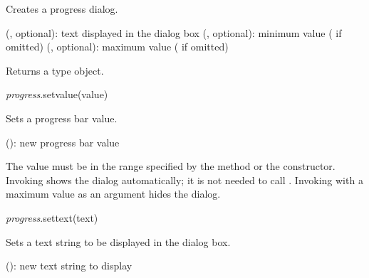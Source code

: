 \documentclass[a4paper,12pt,twoside,extrafontsizes]{memoir}
\begin{document}
\begin{funcdescr}
	Creates a progress dialog.
\end{funcdescr}

\begin{funcparams}
	 (, optional): text displayed in the dialog box
	 (, optional): minimum value ( if omitted)
	 (, optional): maximum value ( if omitted)
\end{funcparams}

\begin{funcret}
	Returns a  type object.
\end{funcret}


\begin{luafuncprototype}
\emph{progress}.setvalue(value)
\end{luafuncprototype}

\begin{funcdescr}
	Sets a progress bar value.
\end{funcdescr}

\begin{funcparams}
	 (): new progress bar value
\end{funcparams}

\begin{funcremarks}
	The value must be in the range specified by the 
	 method or the constructor. Invoking  shows the dialog automatically; it is not needed to call . Invoking  with a maximum value as an argument hides the dialog.
\end{funcremarks}


\begin{luafuncprototype}
\emph{progress}.settext(text)
\end{luafuncprototype}

\begin{funcdescr}
	Sets a text string to be displayed in the dialog box.
\end{funcdescr}

\begin{funcparams}
	 (): new text string to display
\end{funcparams}
\end{document}
